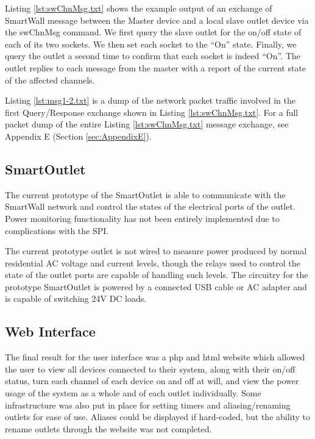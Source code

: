 \documentclass[12pt]{article}
\begin{document}


Listing \ref{lst:swChnMsg.txt} shows the example output of an exchange
of SmartWall message between the Master device and a local slave
outlet device via the swChnMsg command. We first query the slave
outlet for the on/off state of each of its two sockets. We then set
each socket to the ``On'' state. Finally, we query the outlet a second
time to confirm that each socket is indeed ``On''. The outlet replies
to each message from the master with a report of the current state of
the affected channels.



Listing \ref{lst:msg1-2.txt} is a dump of the network packet traffic
involved in the first Query/Response exchange shown in Listing
\ref{lst:swChnMsg.txt}. For a full packet dump of the entire
Listing \ref{lst:swChnMsg.txt} message exchange, see Appendix E (Section
\ref{sec:AppendixE}).



\subsection{SmartOutlet}
The current prototype of the SmartOutlet is able to communicate with
the SmartWall network and control the states of the electrical ports of the
outlet. Power monitoring functionality has not been entirely
implemented due to complications with the SPI.

The current prototype
outlet is not wired to measure power produced by normal residential AC
voltage and current levels, though the relays used to
control the state of the outlet ports are capable of handling such
levels.  The circuitry for the prototype SmartOutlet is powered by a
connected USB cable or AC adapter and is capable of switching 24V DC
loads.

\subsection{Web Interface}

The final result for the user interface was a php and html website
which allowed the user to view all devices connected to their system,
along with their on/off status, turn each channel of each device on
and off at will, and view the power usage of the system as a whole
and of each outlet individually. Some infrastructure was also put in
place for setting timers and aliasing/renaming outlets for ease of
use. Aliases could be displayed if hard-coded, but the ability to
rename outlets through the website was not completed.
\end{document}
